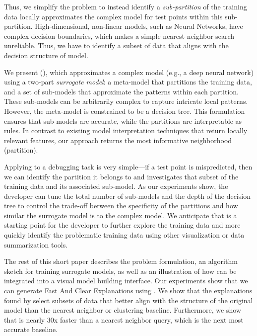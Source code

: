 Thus, we simplify the problem to instead identify a {\it sub-partition} of the training data locally approximates the complex model for test points within this sub-partition.  
High-dimensional, non-linear models, such as Neural Networks, have complex decision boundaries, which makes a simple nearest neighbor search unreliable.
Thus, we have to identify a subset of data that aligns with the decision structure of model.

We present \sysfull (\sys), which approximates a complex model (e.g., a deep neural network) using a two-part {\it surrogate model}: a meta-model that partitions the training data, and a set of sub-models that approximate the patterns within each partition.
These sub-models can be arbitrarily complex to capture intricate local patterns. However, the meta-model is constrained to be a decision tree.
This formulation ensures that sub-models are accurate, while the partitions are interpretable as rules.
In contrast to existing model interpretation techniques that return locally relevant features, our approach returns the most informative neighborhood (partition).

Applying \sys to a debugging task is very simple---if a test point is mispredicted, then we can identify the partition it belongs to and investigates that subset of the training data and its associated sub-model.
As our experiments show, the developer can tune the total number of sub-models and the depth of the decision tree to control the trade-off between the specificity of the partitions and how similar the surrogate model is to the complex model.
We anticipate that \sys is a starting point for the developer to further explore the training data and more quickly identify the problematic training data using other visualization or data summarization tools.

The rest of this short paper describes the \sys problem formulation, an algorithm sketch for training surrogate models, as well as an illustration of how \sys can be integrated into a visual model building interface.
Our experiments show that we can generate Fast And Clear Explanations using \sys.
We show that the explanations found by \sys select subsets of data that better align with the structure of the original model than the nearest neighbor or clustering baseline.
Furthermore, we show that \sys is nearly 30x faster than a nearest neighbor query, which is the next most accurate baseline.







